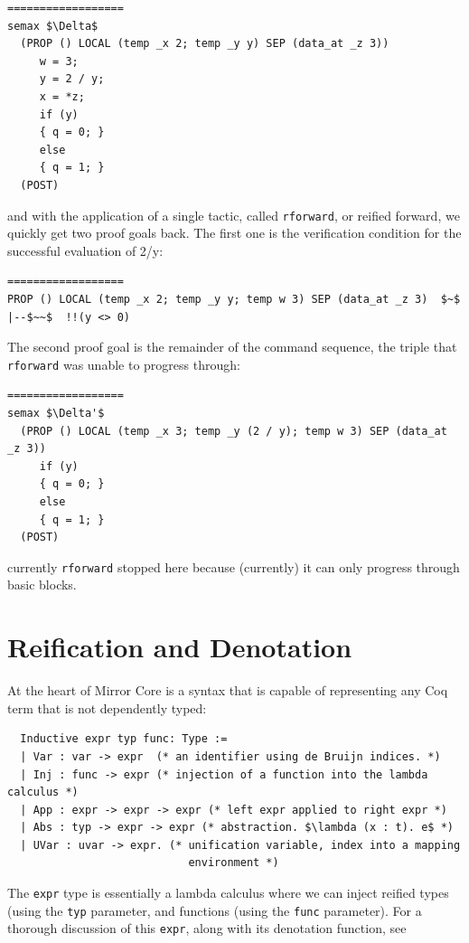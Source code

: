 \documentclass{puthesis}
\begin{document}
\begin{lstlisting}
==================
semax $\Delta$ 
  (PROP () LOCAL (temp _x 2; temp _y y) SEP (data_at _z 3)) 
     w = 3;
     y = 2 / y; 
     x = *z;
     if (y) 
     { q = 0; }
     else
     { q = 1; }
  (POST)
\end{lstlisting}

and with the application of a single tactic, called
\lstinline|rforward|, or reified forward, we quickly get two proof
goals back.  The first one is the verification condition for the
successful evaluation of 2/y:

\begin{lstlisting}
================== 
PROP () LOCAL (temp _x 2; temp _y y; temp w 3) SEP (data_at _z 3)  $~$ |--$~~$  !!(y <> 0) 
\end{lstlisting}

The second proof goal is the remainder of the command sequence, the
triple that \lstinline|rforward| was unable to progress through:

 
\begin{lstlisting}
==================
semax $\Delta'$ 
  (PROP () LOCAL (temp _x 3; temp _y (2 / y); temp w 3) SEP (data_at _z 3)) 
     if (y) 
     { q = 0; }
     else
     { q = 1; }
  (POST)
\end{lstlisting}
\noindent currently \lstinline|rforward| stopped here because
(currently) it can only progress through basic blocks.

\section{Reification and Denotation}
\label{sec:reification}

At the heart of Mirror Core is a syntax that is capable of
representing any Coq term that is not dependently typed:

\begin{lstlisting}
  Inductive expr typ func: Type :=
  | Var : var -> expr  (* an identifier using de Bruijn indices. *)
  | Inj : func -> expr (* injection of a function into the lambda calculus *)
  | App : expr -> expr -> expr (* left expr applied to right expr *)
  | Abs : typ -> expr -> expr (* abstraction. $\lambda (x : t). e$ *)
  | UVar : uvar -> expr. (* unification variable, index into a mapping
                            environment *)
\end{lstlisting}

The \lstinline|expr| type is essentially a lambda calculus where we
can inject reified types (using the \lstinline|typ| parameter, and
functions (using the \lstinline|func| parameter). For a thorough
discussion of this \lstinline|expr|, along with its denotation
function, see \cite[section~3.1]{malecha:thesis}
\end{document}
